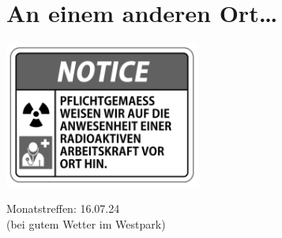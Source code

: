 \documentclass[final]{multiversum}
\begin{document}
\vfill

\section{An einem anderen Ort\ldots}

\includegraphics[width=0.48\textwidth]{src/img/RADIOAKTIVE_ARBEITSKRAFT_greyscale.png}

\vfill

\begin{termine}
\item Monatstreffen: 16.07.24\\(bei gutem Wetter im Westpark)
\end{termine}
\impressum
\end{document}
